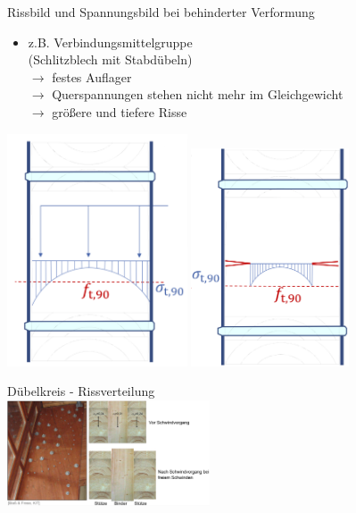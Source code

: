 \documentclass[fleqn,twoside]{article}
\begin{document}
        Rissbild und Spannungsbild bei behinderter Verformung\\
            \begin{minipage}{0.6\textwidth}
                \begin{itemize}
                    \item z.B. Verbindungsmittelgruppe \\(Schlitzblech mit Stabdübeln)\\
                        $\rightarrow$ festes Auflager\\
                        $\rightarrow$ Querspannungen stehen
                        nicht mehr im Gleichgewicht\\
                        $\rightarrow$ größere und tiefere Risse
                \end{itemize}
            \end{minipage}
            \begin{minipage}{0.4\textwidth}
                \includegraphics[width=0.4\textwidth]{Grafiken/Holzfeuchte/Risse behinderte Spannung 01.png}
                \includegraphics[width=0.35\textwidth]{Grafiken/Holzfeuchte/Risse behinderte Spannung 02.png}
            \end{minipage}
        Dübelkreis - Rissverteilung\\
                \includegraphics[width=0.45\textwidth]{Grafiken/Holzfeuchte/Duebelkreis Schwinden.png}
\end{document}
